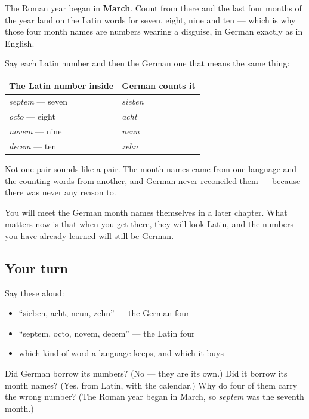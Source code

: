 \begin{culture}
The Roman year began in \textbf{March}. Count from there and the last four months of the year land on the Latin words for seven, eight, nine and ten — which is why those four month names are numbers wearing a disguise, in German exactly as in English.

Say each Latin number and then the German one that means the same thing:

\noindent
\begin{tabularx}{\linewidth}{@{}>{\raggedright\arraybackslash}X>{\raggedright\arraybackslash}X@{}}
\toprule
\textbf{The Latin number inside} & \textbf{German counts it} \\
\midrule
\emph{septem} — seven & \emph{sieben} \\
\emph{octo} — eight & \emph{acht} \\
\emph{novem} — nine & \emph{neun} \\
\emph{decem} — ten & \emph{zehn} \\
\bottomrule
\end{tabularx}

Not one pair sounds like a pair. The month names came from one language and the counting words from another, and German never reconciled them — because there was never any reason to.

You will meet the German month names themselves in a later chapter. What matters now is that when you get there, they will look Latin, and the numbers you have already learned will still be German.
\end{culture}

\subsection*{Your turn}
Say these aloud:

\begin{itemize}
\raggedright
  \item \textquotedblleft{}sieben, acht, neun, zehn\textquotedblright{} — the German four
  \item \textquotedblleft{}septem, octo, novem, decem\textquotedblright{} — the Latin four
  \item which kind of word a language keeps, and which it buys
\end{itemize}

\begin{tcolorbox}[breakable,colback=teal!4,colframe=teal!35!black,title={Before you move on}]
Did German borrow its numbers? (No — they are its own.) Did it borrow its month names? (Yes, from Latin, with the calendar.) Why do four of them carry the wrong number? (The Roman year began in March, so \emph{septem} was the seventh month.)
\end{tcolorbox}
